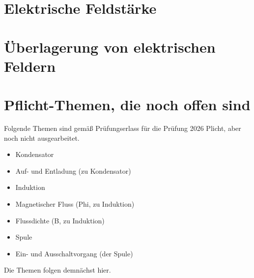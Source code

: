 \documentclass[a4paper, 10pt]{scrartcl}
\begin{document}
\section[E-Feld]{Elektrische Feldstärke}



\section[Überlagerung E]{Überlagerung von elektrischen Feldern}

\section{Pflicht-Themen, die noch offen sind}
Folgende Themen sind gemäß Prüfungserlass für die Prüfung 2026 Plicht, aber noch nicht ausgearbeitet.
\begin{itemize}
    \item Kondensator
    \item Auf- und Entladung (zu Kondensator)
    \item Induktion
    \item Magnetischer Fluss (Phi, zu Induktion)
    \item Flussdichte (B, zu Induktion) 
    \item Spule
    \item Ein- und Ausschaltvorgang (der Spule)
\end{itemize}

Die Themen folgen demnächst hier.
\end{document}

